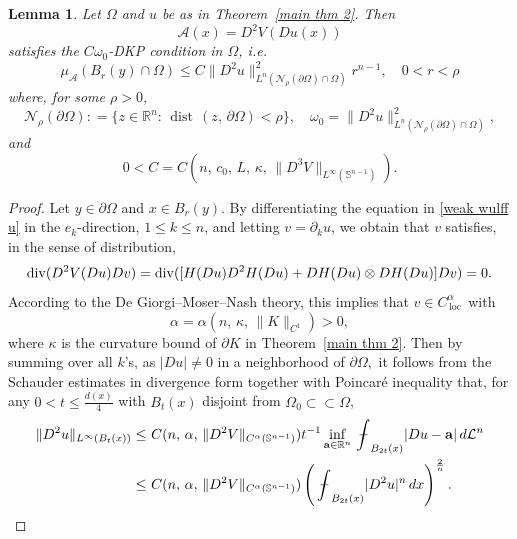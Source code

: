 \documentclass[reqno,11pt]{amsart}
\makeatletter
\def\az{\alpha}
\def\dist{{\mathop\mathrm{\,dist\,}}}
\def\loc{{\mathop\mathrm{\,loc\,}}}
\def\bint{{\ifinner\rlap{\bf\kern.35em--}
\int\else\rlap{\bf\kern.45em--}\int\fi}\ignorespaces}
\newtheorem{lem}[thm]{Lemma}%
\numberwithin{equation}{section}
\theoremstyle{remark}
\def\bint{{\ifinner\rlap{\bf\kern.35em--}
\int\else\rlap{\bf\kern.45em--}\int\fi}\ignorespaces}
\makeatother
\begin{document}
\begin{lem}\label{A DKP}
    Let $\Omega$ and $u$ be  as in Theorem~\ref{main thm 2}. Then 
    $$\mathcal A(x)= D^2V( Du(x))$$
    satisfies the $C\omega_0$-DKP condition in $\Omega$, i.e.
    $$\mu_\mathcal A(B_r(y)\cap \Omega)\le C \| D^2 u\|^{2}_{L^n(\mathcal N_\rho(\partial \Omega)\cap \Omega)}r^{n-1},\quad 0<r<\rho$$
    where, for some $\rho>0$, 
$$\mathcal N_\rho(\partial \Omega): =\{z\in \mathbb R^n\colon \dist(z,\,\partial\Omega)<\rho\}, \quad \omega_0=\|D^2u\|^2_{L^n(\mathcal N_\rho(\partial \Omega)\cap \Omega)},$$
    and
    $$0<C=C(n,\,c_0,\,L,\,\kappa,\,   \|D^3V\|_{L^\infty(\mathbb S^{n-1})}).$$
\end{lem}
\begin{proof}
    Let $y\in \partial\Omega$ and $x\in B_{r}(y)$.
    By differentiating the equation in \eqref{weak wulff u} in the $e_k$-direction, $1\le k\le n$, and letting $v=\partial_k u$, we obtain that $v$ satisfies, in the sense of distribution, 
    $${\rm div} (D^2V(Du) Dv)={\rm div}([H(Du)D^2H(Du)+DH(Du)\otimes DH(Du)]Dv )=0.$$
    According to the De Giorgi--Moser--Nash theory, this implies that $v\in C_\loc^{\alpha}$ with
    $$\alpha=\az(n,\,\kappa,\,\|K\|_{C^1})>0,$$
    where $\kappa$ is the curvature bound of $\partial K$ in Theorem~\ref{main thm 2}. 
    Then by summing over all $k$'s, as $|Du|\neq 0$ in a neighborhood of $\partial \Omega,$ it follows from the Schauder estimates in divergence form together with Poincar\'e inequality that, for any  $0<t\le \frac{d(x)} 4$ with $B_t(x)$ disjoint from $\Omega_0\subset\subset\Omega$, 
    \begin{align}
        \|D^2u\|_{L^\infty(B_t(x))}\le &\ C(n,\,\az,\,\|D^2V\|_{C^\az(\mathbb S^{n-1})})t^{-1} \inf_{{\bf a}\in\mathbb R^n}\bint_{B_{2t}(x)}|Du-{\bf a}|\,d\mathcal L^n\nonumber\\
        \le & \ C(n,\,\az,\,\|D^2V\|_{C^\az(\mathbb S^{n-1})}) \left(\bint_{B_{2t}(x)} |D^2 u|^n\, dx\right)^{\frac 2 n}. \label{bounded hessian}
    \end{align} 


\end{proof}
\end{document}
